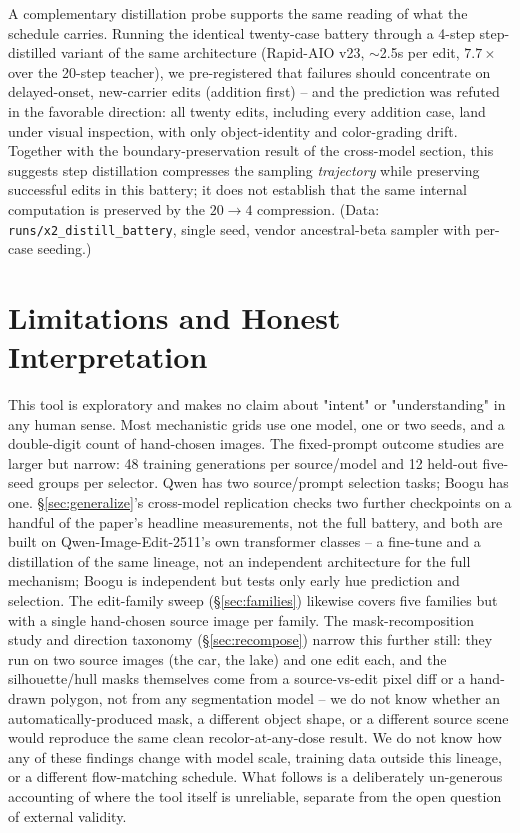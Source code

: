 \documentclass[10pt,twocolumn,letterpaper]{article}
\newcommand{\model}{Qwen-Image-Edit-2511}
\begin{document}
A complementary distillation probe supports the same reading of what the
schedule carries. Running the identical twenty-case battery through a
4-step step-distilled variant of the same architecture (Rapid-AIO v23,
$\sim$2.5s per edit, $7.7\times$ over the 20-step teacher), we
pre-registered that failures should concentrate on delayed-onset,
new-carrier edits (addition first) -- and the prediction was refuted in
the favorable direction: all twenty edits, including every addition
case, land under visual inspection, with only object-identity and
color-grading drift. Together with the boundary-preservation result of
the cross-model section, this suggests step distillation compresses the
sampling \emph{trajectory} while preserving successful edits in this
battery; it does not establish that the same internal computation is
preserved by the $20\!\to\!4$ compression.
(Data: \texttt{runs/x2\_distill\_battery}, single seed, vendor
ancestral-beta sampler with per-case seeding.)

\section{Limitations and Honest Interpretation}\label{sec:limits}

This tool is exploratory and makes no claim about "intent" or
"understanding" in any human sense. Most mechanistic grids use one
model, one or two seeds, and a double-digit count of hand-chosen images.
The fixed-prompt outcome studies are larger but narrow: 48 training
generations per source/model and 12 held-out five-seed groups per
selector. Qwen has two source/prompt selection tasks; Boogu has one.
\S\ref{sec:generalize}'s cross-model replication checks two further
checkpoints on a handful of the paper's headline measurements, not the
full battery, and both are built on \model{}'s own transformer classes --
a fine-tune and a distillation of the same lineage, not an independent
architecture for the full mechanism; Boogu is independent but tests only
early hue prediction and selection. The edit-family sweep (\S\ref{sec:families}) likewise
covers five families but with a single hand-chosen source image per
family. The mask-recomposition study and direction taxonomy
(\S\ref{sec:recompose}) narrow this further still: they run on two
source images (the car, the lake) and one edit each, and the
silhouette/hull masks themselves come from a source-vs-edit pixel diff
or a hand-drawn polygon, not from any segmentation model -- we do not
know whether an automatically-produced mask, a different object shape,
or a different source scene would reproduce the same clean
recolor-at-any-dose result. We do not know how any of these findings
change with model scale, training data outside this lineage, or a
different flow-matching schedule. What follows is a deliberately un-generous accounting of where
the tool itself is unreliable, separate from the open question of
external validity.
\end{document}
